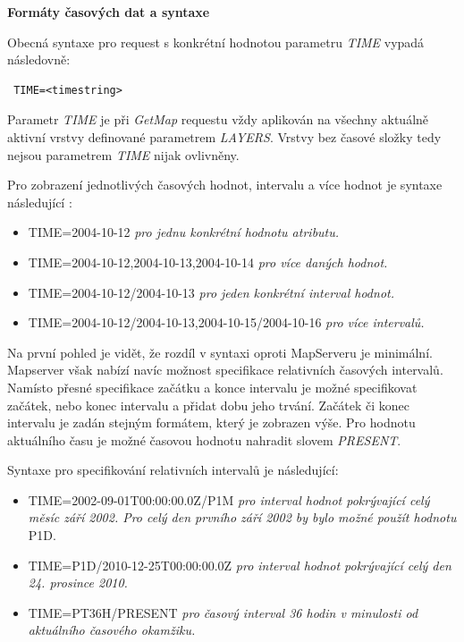 \bigskip
\noindent \textbf{Formáty časových dat a syntaxe}

\noindent Obecná syntaxe pro request s konkrétní hodnotou parametru
\textit{TIME} vypadá následovně:

\begin{verbatim} TIME=<timestring>
\end{verbatim}

Parametr \textit{TIME} je při \textit{GetMap} requestu vždy aplikován
na všechny aktuálně aktivní vrstvy definované parametrem
\textit{LAYERS}. Vrstvy bez časové složky tedy nejsou parametrem
\textit{TIME} nijak ovlivněny.

Pro zobrazení jednotlivých časových hodnot, intervalu a více hodnot je
syntaxe následující \cite{geoserver-time}:

\begin{itemize}
	\item TIME=2004-10-12 \textit{pro jednu konkrétní hodnotu
atributu.}
	\item TIME=2004-10-12,2004-10-13,2004-10-14 \textit{pro více
daných hodnot.}
	\item TIME=2004-10-12/2004-10-13 \textit{pro jeden konkrétní
interval hodnot.}
	\item TIME=2004-10-12/2004-10-13,2004-10-15/2004-10-16
\textit{pro více intervalů.}
\end{itemize}

Na první pohled je vidět, že rozdíl v syntaxi oproti MapServeru je
minimální. Mapserver však nabízí navíc možnost specifikace relativních
časových intervalů. Namísto přesné specifikace začátku a konce
intervalu je možné specifikovat začátek, nebo konec intervalu a přidat
dobu jeho trvání. Začátek či konec intervalu je zadán stejným
formátem, který je zobrazen výše. Pro hodnotu aktuálního času je možné
časovou hodnotu nahradit slovem \textit{PRESENT}.

Syntaxe pro specifikování relativních intervalů je
následující\cite{geoserver-time}:

\begin{itemize}
	\item TIME=2002-09-01T00:00:00.0Z/P1M \textit{pro interval
hodnot pokrývající celý měsíc září 2002. Pro celý den prvního září
2002 by bylo možné použít hodnotu} P1D.
	\item TIME=P1D/2010-12-25T00:00:00.0Z \textit{pro interval
hodnot pokrývající celý den 24. prosince 2010.}
	\item TIME=PT36H/PRESENT \textit{pro časový interval 36 hodin
v minulosti od aktuálního časového okamžiku.}
\end{itemize}

